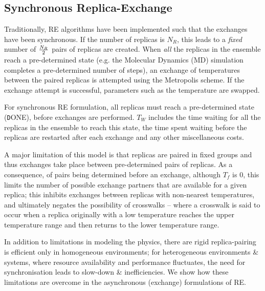 \documentclass{rspublic}
\begin{document}

\subsection{Synchronous Replica-Exchange}

Traditionally, RE algorithms have been implemented such that the
exchanges have been synchronous.  If the number of replicas is
${N_R}$, this leads to a {\it fixed} number of ${N_R \over 2}$ pairs
of replicas are created.  When \emph{all} the replicas in the ensemble
reach a pre-determined state (e.g. the Molecular Dynamics (MD)
simulation completes a pre-determined number of steps), an exchange of
temperatures between the paired replicas is attempted using the
Metropolis scheme.  If the exchange attempt is successful, parameters
such as the temperature are swapped.


For synchronous RE formulation, all replicas must reach a
pre-determined state ({\texttt DONE}), before exchanges are performed.
$T_W$ includes the time waiting for all the replicas in the ensemble
to reach this state, the time spent waiting before the replicas are
restarted after each exchange and any other miscellaneous costs.

A major limitation of this model is that replicas are paired in fixed
groups and thus exchanges take place between pre-determined pairs of
replicas.  As a consequence, of pairs being determined before an
exchange, although $T_f$ is $0$, this limits the number of possible
exchange partners that are available for a given replica; this
inhibits exchanges between replicas with non-nearest temperatures, and
ultimately negates the possibility of crosswalks -- where a crosswalk
is said to occur when a replica originally with a low temperature
reaches the upper temperature range and then returns to the lower
temperature range.

In addition to limitations in modeling the physics, there are rigid
replica-pairing is efficient only in homogeneous environments; for
heterogeneous environments \& systems, where resource availability and
performance fluctuates, the need for synchronisation leads to
slow-down \& inefficiencies. We show how these limitations are
overcome in the asynchronous (exchange) formulations of RE.
\end{document}
